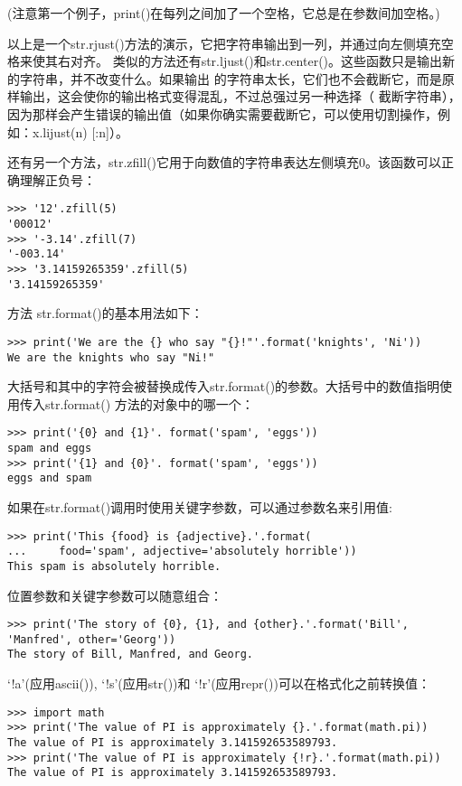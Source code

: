 \documentclass[UTF8]{ctexart}
\begin{document}
(注意第一个例子，print()在每列之间加了一个空格，它总是在参数间加空格。)

以上是一个str.rjust()方法的演示，它把字符串输出到一列，并通过向左侧填充空格来使其右对齐。
类似的方法还有str.ljust()和str.center()。这些函数只是输出新的字符串，并不改变什么。如果输出
的字符串太长，它们也不会截断它，而是原样输出，这会使你的输出格式变得混乱，不过总强过另一种选择（
截断字符串），因为那样会产生错误的输出值（如果你确实需要截断它，可以使用切割操作，例如：x.lijust(n)
[:n]）。

还有另一个方法，str.zfill()它用于向数值的字符串表达左侧填充0。该函数可以正确理解正负号：
\begin{verbatim}
>>> '12'.zfill(5)
'00012'
>>> '-3.14'.zfill(7)
'-003.14'
>>> '3.14159265359'.zfill(5)
'3.14159265359'
\end{verbatim}

方法 str.format()的基本用法如下：
\begin{verbatim}
>>> print('We are the {} who say "{}!"'.format('knights', 'Ni'))
We are the knights who say "Ni!"
\end{verbatim}

大括号和其中的字符会被替换成传入str.format()的参数。大括号中的数值指明使用传入str.format()
方法的对象中的哪一个：
\begin{verbatim}
>>> print('{0} and {1}'. format('spam', 'eggs'))
spam and eggs
>>> print('{1} and {0}'. format('spam', 'eggs'))
eggs and spam
\end{verbatim}

如果在str.format()调用时使用关键字参数，可以通过参数名来引用值:
\begin{verbatim}
>>> print('This {food} is {adjective}.'.format(
...     food='spam', adjective='absolutely horrible'))
This spam is absolutely horrible.
\end{verbatim}

位置参数和关键字参数可以随意组合：
\begin{verbatim}
>>> print('The story of {0}, {1}, and {other}.'.format('Bill', 'Manfred', other='Georg'))
The story of Bill, Manfred, and Georg.
\end{verbatim}

`!a'(应用ascii()), `!s'(应用str())和 `!r'(应用repr())可以在格式化之前转换值：
\begin{verbatim}
>>> import math
>>> print('The value of PI is approximately {}.'.format(math.pi))
The value of PI is approximately 3.141592653589793.
>>> print('The value of PI is approximately {!r}.'.format(math.pi))
The value of PI is approximately 3.141592653589793.
\end{verbatim}
\end{document}
